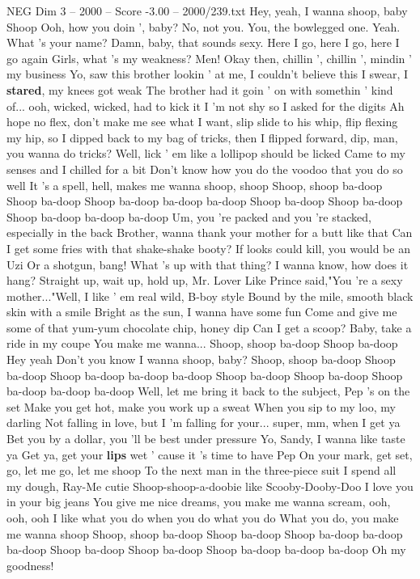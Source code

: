 \begin{textsample}{NEG Dim 3 – 2000 – Score -3.00 – 2000/239.txt}  \label{ex:f3_neg_002}
Hey, yeah, I wanna shoop, baby Shoop Ooh, how you doin ', baby?
No, not you.
You, the bowlegged one.
Yeah.
What 's your name?
Damn, baby, that sounds sexy.
Here I go, here I go, here I go again Girls, what 's my weakness?
Men!
Okay then, chillin ', chillin ', mindin ' my business Yo, saw this brother lookin ' at me, I couldn't believe this I swear, I \textbf{stared}, my knees got weak The brother had it goin ' on with somethin ' kind of... ooh, wicked, wicked, had to kick it I 'm not shy so I asked for the digits Ah hope no flex, don't make me see what I want, slip slide to his whip, flip flexing my hip, so I dipped back to my bag of tricks, then I flipped forward, dip, man, you wanna do tricks?
Well, lick ' em like a lollipop should be licked Came to my senses and I chilled for a bit Don't know how you do the voodoo that you do so well It 's a spell, hell, makes me wanna shoop, shoop Shoop, shoop ba-doop Shoop ba-doop Shoop ba-doop ba-doop ba-doop Shoop ba-doop Shoop ba-doop Shoop ba-doop ba-doop ba-doop Um, you 're packed and you 're stacked, especially in the back Brother, wanna thank your mother for a butt like that Can I get some fries with that shake-shake booty?
If looks could kill, you would be an Uzi Or a shotgun, bang!
What 's up with that thing?
I wanna know, how does it hang?
Straight up, wait up, hold up, Mr.
Lover Like Prince said,"You 're a sexy mother..."Well, I like ' em real wild, B-boy style Bound by the mile, smooth black skin with a smile Bright as the sun, I wanna have some fun Come and give me some of that yum-yum chocolate chip, honey dip Can I get a scoop?
Baby, take a ride in my coupe You make me wanna...
Shoop, shoop ba-doop Shoop ba-doop Hey yeah Don't you know I wanna shoop, baby?
Shoop, shoop ba-doop Shoop ba-doop Shoop ba-doop ba-doop ba-doop Shoop ba-doop Shoop ba-doop Shoop ba-doop ba-doop ba-doop Well, let me bring it back to the subject, Pep 's on the set Make you get hot, make you work up a sweat When you sip to my loo, my darling Not falling in love, but I 'm falling for your... super, mm, when I get ya Bet you by a dollar, you 'll be best under pressure Yo, Sandy, I wanna like taste ya Get ya, get your \textbf{lips} wet ' cause it 's time to have Pep On your mark, get set, go, let me go, let me shoop To the next man in the three-piece suit I spend all my dough, Ray-Me cutie Shoop-shoop-a-doobie like Scooby-Dooby-Doo I love you in your big jeans You give me nice dreams, you make me wanna scream, ooh, ooh, ooh I like what you do when you do what you do What you do, you make me wanna shoop Shoop, shoop ba-doop Shoop ba-doop Shoop ba-doop ba-doop ba-doop Shoop ba-doop Shoop ba-doop Shoop ba-doop ba-doop ba-doop Oh my goodness!

\end{textsample}
